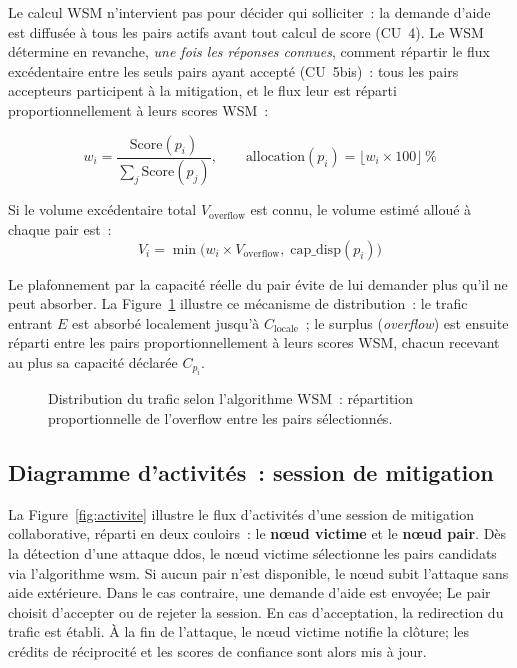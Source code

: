 Le calcul WSM n'intervient pas pour décider qui solliciter~: la demande d'aide est
diffusée à tous les pairs actifs avant tout calcul de score (CU~4). Le WSM
détermine en revanche, \emph{une fois les réponses connues}, comment répartir le
flux excédentaire entre les seuls pairs ayant accepté (CU~5bis)~: tous les pairs
accepteurs participent à la mitigation, et le flux leur est réparti
proportionnellement à leurs scores WSM~:

\begin{equation}
\label{eq:alloc}
w_i = \frac{\text{Score}(p_i)}{\displaystyle\sum_j \text{Score}(p_j)}, \qquad
\text{allocation}(p_i) = \lfloor w_i \times 100 \rfloor\,\%
\end{equation}

Si le volume excédentaire total $V_{\text{overflow}}$ est connu, le volume estimé alloué à chaque pair est~:
\begin{equation}
V_i = \min\bigl(w_i \times V_{\text{overflow}},\; \text{cap\_disp}(p_i)\bigr)
\end{equation}

Le plafonnement par la capacité réelle du pair évite de lui demander plus qu'il ne peut absorber. La Figure~\ref{fig:wsm_distribution} illustre ce mécanisme de distribution~: le trafic entrant $E$ est absorbé localement jusqu'à $C_{\text{locale}}$~; le surplus (\textit{overflow}) est ensuite réparti entre les pairs proportionnellement à leurs scores WSM, chacun recevant au plus sa capacité déclarée $C_{p_i}$.

\begin{figure}[H]
\centering
{}
\caption{Distribution du trafic selon l'algorithme WSM~: répartition proportionnelle de l'overflow entre les pairs sélectionnés.}
\label{fig:wsm_distribution}
\end{figure}

\subsection{Diagramme d'activités~: session de mitigation}
\label{subsec:activites}

La Figure~\ref{fig:activite} illustre le flux d'activités d'une session de mitigation collaborative, réparti en deux couloirs~: le \textbf{nœud victime} et le \textbf{nœud pair}. Dès la détection d'une attaque \gls{ddos}, le nœud victime sélectionne les pairs candidats via l'algorithme \gls{wsm}. Si aucun pair n'est disponible, le nœud subit l'attaque sans aide extérieure. Dans le cas contraire, une demande d'aide est envoyée; Le pair choisit d’accepter ou de rejeter la session. En cas d'acceptation, la redirection du trafic est établi. À la fin de l'attaque, le nœud victime notifie la clôture; les crédits de réciprocité et les scores de confiance sont alors mis à jour.

